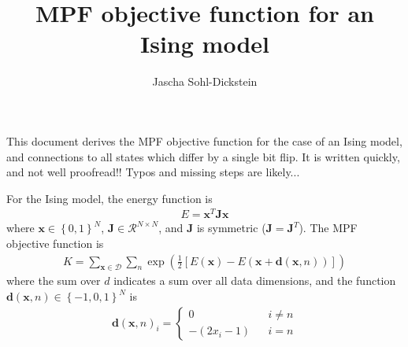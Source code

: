 \documentclass{article}
\title{MPF objective function for an Ising model}
\author{
Jascha Sohl-Dickstein
}
\newcommand{\mb}{\mathbf}
\begin{document}
\maketitle

This document derives the MPF objective function for the case of an Ising model, and connections to all states which differ by a single bit flip.  It is written quickly, and not well proofread!!  Typos and missing steps are likely...

For the Ising model, the energy function is
\begin{align}
E = \mb x^T \mb J \mb x
\end{align}
where $\mb x \in \left\{ 0, 1 \right\}^N$, $\mb J \in \mathcal R^{N\times N}$, and $\mb J$ is symmetric ($\mb J = \mb J^T$).
The MPF objective function is
\begin{align}
K = \sum_{\mb x \in \mathcal D} \sum_n \exp\left( \frac{1}{2}\left[
E(\mb x) - E(\mb x + {\mb d}(\mb x, n)) \right] \right)
\end{align}
where the sum over $d$ indicates a sum over all data dimensions, and the function ${\mb d}(\mb x, n) \in \left\{ -1, 0, 1 \right\}^N$ is
\begin{align}
{\mb d}(\mb x, n)_i =
	\left\{\begin{array}{ccc}
0 & & i \neq n \\
-(2 x_i - 1) & & i = n
	\end{array}\right.
\end{align}
\end{document}
